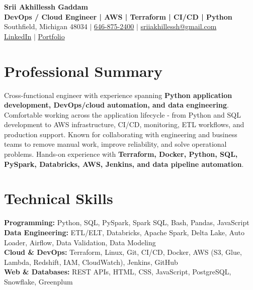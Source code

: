 \documentclass[letterpaper,10pt]{article}
\begin{document}
\fontsize{9.35pt}{10.45pt}\selectfont

\begin{center}
    {\LARGE \textbf{Srii Akhillessh Gaddam}} \\[-1pt]
    \textbf{DevOps / Cloud Engineer | AWS | Terraform | CI/CD | Python} \\[2pt]
    Southfield, Michigan 48034 $|$
    \href{tel:6468752400}{646-875-2400} $|$
    \href{mailto:sriiakhillessh@gmail.com}{sriiakhillessh@gmail.com} \\[1pt]
    \href{https://www.linkedin.com/in/srii-akhiilessh-gaddam-b48668191/}{LinkedIn} $|$
    \href{https://sriiakhillesshg.github.io/portfolio/}{Portfolio}
\end{center}
\vspace{-8pt}

\section{Professional Summary}
\small{Cross-functional engineer with experience spanning \textbf{Python application development, DevOps/cloud automation, and data engineering}. Comfortable working across the application lifecycle - from Python and SQL development to AWS infrastructure, CI/CD, monitoring, ETL workflows, and production support. Known for collaborating with engineering and business teams to remove manual work, improve reliability, and solve operational problems. Hands-on experience with \textbf{Terraform, Docker, Python, SQL, PySpark, Databricks, AWS, Jenkins, and data pipeline automation}.}

\section{Technical Skills}
\small{
\textbf{Programming:} Python, SQL, PySpark, Spark SQL, Bash, Pandas, JavaScript \\
\textbf{Data Engineering:} ETL/ELT, Databricks, Apache Spark, Delta Lake, Auto Loader, Airflow, Data Validation, Data Modeling \\
\textbf{Cloud \& DevOps:} Terraform, Linux, Git, CI/CD, Docker, AWS (S3, Glue, Lambda, Redshift, IAM, CloudWatch), Jenkins, GitHub \\
\textbf{Web \& Databases:} REST APIs, HTML, CSS, JavaScript, PostgreSQL, Snowflake, Greenplum
}
\end{document}
